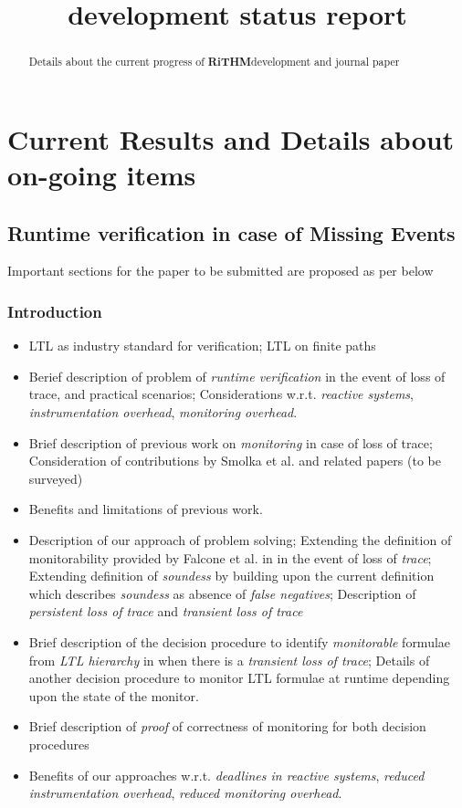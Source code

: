 \documentclass[]{article}
\title{\rithm development status report}
\author{}
\newcommand{\rithm}{\textbf{RiTHM}\space}
\newcommand{\tloss}{\emph{transient loss of trace}}
\newcommand{\ploss}{\emph{persistent loss of trace}}
\begin{document}
\maketitle


\begin{abstract}
Details about the current progress of \rithm development and journal paper
\end{abstract}
\section{Current Results and Details about on-going items}

			\subsection{Runtime verification in case of Missing Events}
			Important sections for the paper to be submitted are proposed as per below

			\subsubsection{Introduction}
			\begin{itemize}
				\item LTL as industry standard for verification; LTL on finite paths
				\item Berief description of problem of \emph{runtime verification} in the event of loss of trace, and practical scenarios; Considerations w.r.t. \emph{reactive systems},  \emph{instrumentation overhead}, \emph{monitoring overhead}.
				\item Brief description of previous work on \emph{monitoring} in case of loss of trace; Consideration of contributions by Smolka et al. and related papers (to be surveyed)
				\item Benefits and limitations of previous work.
				\item Description of our approach of problem solving; Extending the definition of monitorability provided by Falcone et al. in \cite{RefWorks:9} in the event of loss of \emph{trace}; Extending definition of \emph{soundess} by building upon the current definition which describes \emph{soundess} as absence of \emph{false negatives};	Description of \ploss{} and \tloss
				\item Brief description of the decision procedure to identify \emph{monitorable} formulae from \emph{LTL hierarchy} in \cite{RefWorks:11}  when there is a \tloss; Details of another decision procedure to monitor LTL formulae at runtime depending upon the state of the monitor.
				\item Brief description of \emph{proof} of correctness of monitoring for both decision procedures
				\item Benefits of our approaches w.r.t.  \emph{deadlines in reactive systems},  \emph{reduced instrumentation overhead}, \emph {reduced monitoring overhead}.
			\end{itemize}
			
\end{document}
